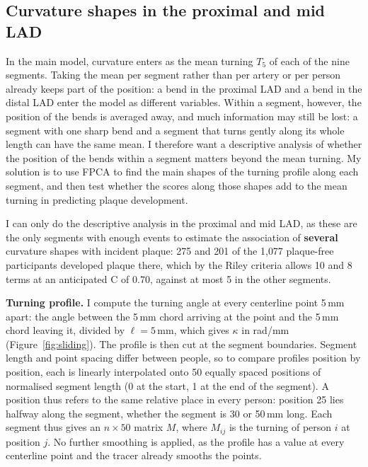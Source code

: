 \subsection*{Curvature shapes in the proximal and mid LAD}
In the main model, curvature enters as the mean turning $T_5$ of each of the nine segments. Taking the mean per segment rather than per artery or per person
already keeps part of the position: a bend in the proximal LAD and a bend in the distal LAD enter the
model as different variables. Within a segment, however, the position of the bends is averaged away,
and much information may still be lost: a segment with one sharp bend and a segment that turns gently
along its whole length can have the same mean. I therefore want a descriptive analysis of whether the
position of the bends within a segment matters beyond the mean turning. My solution is to use FPCA to find the main shapes of the turning profile along each segment, and then test whether the scores along those shapes add to the mean turning in predicting plaque development.


I can only do the descriptive analysis in the proximal and mid LAD, as these are the only segments with enough events to estimate the association of \textbf{several} curvature shapes with incident plaque: 275 and 201 of the
1{,}077 plaque-free participants developed plaque there, which by the Riley criteria allows 10 and 8
terms at an anticipated C of 0.70, against at most 5 in the other segments. 

\textbf{Turning profile.} I compute the turning angle at every
centerline point 5\,mm apart: the angle between the 5\,mm chord arriving at the
point and the 5\,mm chord leaving it, divided by $\ell = 5$\,mm, which gives $\kappa$ in rad/mm
(Figure~\ref{fig:sliding}). The profile is then cut at the segment boundaries. Segment length and point spacing differ between
people, so to compare profiles position by position, each is linearly interpolated onto 50 equally
spaced positions of normalised segment length (0 at the start, 1 at the end of the segment). A position thus refers to the same relative
place in every person: position 25 lies halfway along the segment, whether the segment is 30 or
50\,mm long. Each
segment thus gives an $n \times 50$ matrix $M$, where $M_{ij}$ is the turning of person $i$ at
position $j$. No further smoothing is applied, as the profile has a value at every centerline point
and the tracer already smooths the points.


